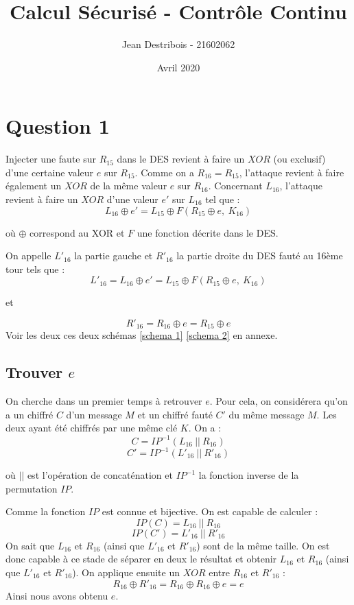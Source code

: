 \documentclass[10pt,a4paper]{article}
\author{Jean Destribois - 21602062}
\title{Calcul Sécurisé - Contrôle Continu}
\date{Avril 2020}
\begin{document}
\maketitle

\section{Question 1}
Injecter une faute sur $R_{15}$ dans le DES revient à faire un $XOR$ (ou exclusif) d'une certaine valeur $e$ sur $R_{15}$. Comme on a $R_{16} = R_{15}$, l'attaque revient à faire également un $XOR$ de la même valeur $e$ sur $R_{16}$. Concernant $L_{16}$, l'attaque revient à faire un $XOR$ d'une valeur $e'$ sur $L_{16}$ tel que :
\[L_{16} \oplus e' = L_{15} \oplus F(R_{15} \oplus e,\ K_{16})\]
\begin{center}où $\oplus$ correspond au XOR et $F$ une fonction décrite dans le DES.\end{center}
On appelle $L'_{16}$ la partie gauche et $R'_{16}$ la partie droite du DES fauté au 16ème tour tels que : 
\[L'_{16} = L_{16} \oplus e' = L_{15} \oplus F(R_{15} \oplus e,\  K_{16})\]
\begin{center}et\end{center}
\[R'_{16} = R_{16} \oplus e = R_{15} \oplus e\]
Voir les deux ces deux schémas \ref{schema 1} \ref{schema 2} en annexe.

\subsection{Trouver $e$}
On cherche dans un premier temps à retrouver $e$. Pour cela, on considérera qu'on a un chiffré $C$ d'un message $M$ et un chiffré fauté $C'$ du même message $M$. Les deux ayant été chiffrés par une même clé $K$.
On a :
\[C = IP^{-1}(L_{16}\ ||\ R_{16})\]
\[C' = IP^{-1}(L'_{16}\ ||\ R'_{16})\]
\begin{center}où $||$ est l'opération de concaténation et $IP^{-1}$ la fonction inverse de la permutation $IP$.\end{center}
Comme la fonction $IP$ est connue et bijective. On est capable de calculer :
\[IP(C) = L_{16}\ ||\ R_{16}\]
\[IP(C') = L'_{16}\ ||\ R'_{16}\]
On sait que $L_{16}$ et $R_{16}$ (ainsi que $L'_{16}$ et $R'_{16}$) sont de la même taille. On est donc capable à ce stade de séparer en deux le résultat et obtenir $L_{16}$ et $R_{16}$ (ainsi que $L'_{16}$ et $R'_{16}$). On applique ensuite un $XOR$ entre $R_{16}$ et $R'_{16}$ :
\[R_{16} \oplus R'_{16} = R_{16} \oplus R_{16} \oplus e=e\]
Ainsi nous avons obtenu $e$.
\end{document}
